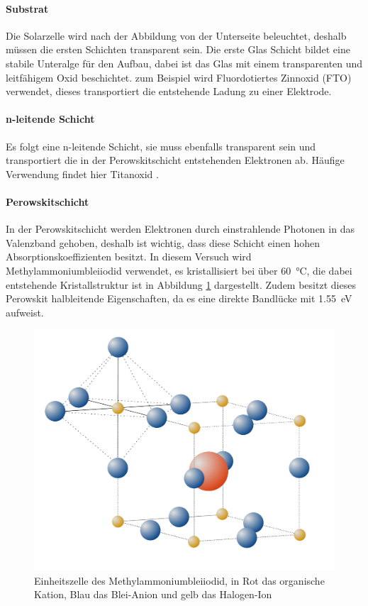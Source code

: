 \documentclass[12pt,a4paper,ngerman]{report}
\begin{document}
	\paragraph{Substrat}
	Die Solarzelle wird nach der Abbildung von der Unterseite beleuchtet, deshalb müssen die ersten Schichten transparent sein. Die erste Glas Schicht bildet eine stabile Unteralge für den Aufbau, dabei ist das Glas mit einem transparenten und leitfähigem Oxid beschichtet. zum Beispiel wird Fluordotiertes Zinnoxid (FTO) verwendet, dieses transportiert die entstehende Ladung zu einer Elektrode.
	\paragraph{n-leitende Schicht}
	Es folgt eine n-leitende Schicht, sie muss ebenfalls transparent sein und transportiert die in der Perowskitschicht entstehenden Elektronen ab. Häufige Verwendung findet hier Titanoxid .
	\paragraph{Perowskitschicht}
	In der Perowskitschicht werden Elektronen durch einstrahlende Photonen in das Valenzband gehoben, deshalb ist wichtig, dass diese Schicht einen hohen Absorptionskoeffizienten besitzt. In diesem Versuch wird Methylammoniumbleiiodid  verwendet, es kristallisiert bei über \SI{60}{\celsius}, die dabei entstehende Kristallstruktur ist in Abbildung \ref{img:PerwoskitZelle} dargestellt. Zudem besitzt dieses Perowskit halbleitende Eigenschaften, da es eine direkte Bandlücke mit \SI{1.55}{\eV} aufweist.
	\begin{figure}[ht]
		\centering
		\includegraphics[width=\textwidth]{Bilder/PerwoskitZelle.pdf}		
		\caption[Einheitszelle von ]{Einheitszelle des Methylammoniumbleiiodid, in Rot das organische Kation, Blau das Blei-Anion und gelb das Halogen-Ion}
		\label{img:PerwoskitZelle}
	\end{figure}
\end{document}
